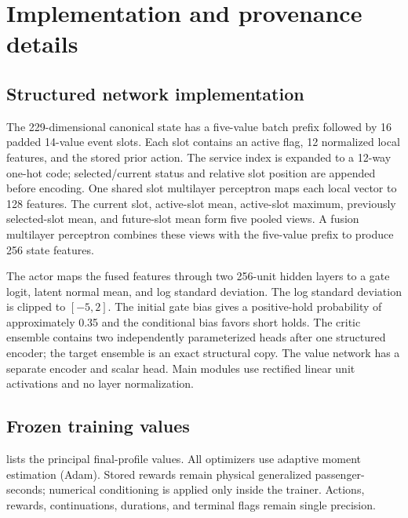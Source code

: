 \section{Implementation and provenance details}
\label{app:impl}

\subsection{Structured network implementation}
\label{app:architecture}

The 229-dimensional canonical state has a five-value batch prefix followed by
16 padded 14-value event slots. Each slot contains an active flag, 12
normalized local features, and the stored prior action. The service index is
expanded to a 12-way one-hot code; selected/current status and relative slot
position are appended before encoding. One shared slot multilayer perceptron
maps each local vector to 128 features. The current slot, active-slot mean,
active-slot maximum, previously selected-slot mean, and future-slot mean form
five pooled views. A fusion multilayer perceptron combines these views with the
five-value prefix to produce 256 state features.

The actor maps the fused features through two 256-unit hidden layers to a gate
logit, latent normal mean, and log standard deviation. The
log standard deviation is clipped to $[-5,2]$. The initial gate bias gives a
positive-hold probability of approximately 0.35 and the conditional bias
favors short holds. The critic ensemble contains two independently
parameterized heads after one structured encoder; the target ensemble is an
exact structural copy. The value network has a separate encoder and scalar
head. Main modules use rectified linear unit activations and no layer
normalization.

\subsection{Frozen training values}
\label{app:training}

 lists the principal final-profile values. All optimizers use
adaptive moment estimation (Adam). Stored rewards remain physical generalized passenger-seconds; numerical
conditioning is applied only inside the trainer. Actions, rewards,
continuations, durations, and terminal flags remain single precision.

